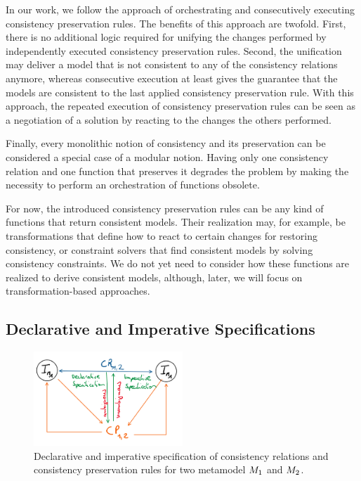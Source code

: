 In our work, we follow the approach of orchestrating and consecutively executing consistency preservation rules.
The benefits of this approach are twofold. First, there is no additional logic required for unifying the changes performed by independently executed consistency preservation rules. 
Second, the unification may deliver a model that is not consistent to any of the consistency relations anymore, whereas consecutive execution at least gives the guarantee that the models are consistent to the last applied consistency preservation rule.
With this approach, the repeated execution of consistency preservation rules can be seen as a negotiation of a solution by reacting to the changes the others performed.

\begin{remark} 
Finally, every monolithic notion of consistency and its preservation can be considered a special case of a modular notion. Having only one consistency relation and one function that preserves it degrades the problem by making the necessity to perform an orchestration of functions obsolete.
\end{remark}

For now, the introduced consistency preservation rules can be any kind of functions that return consistent models. 
Their realization may, for example, be transformations that define how to react to certain changes for restoring consistency, or constraint solvers that find consistent models by solving consistency constraints. 
We do not yet need to consider how these functions are realized to derive consistent models, although, later, we will focus on transformation-based approaches.


\subsection{Declarative and Imperative Specifications}
\label{chap:correcttnes:notions_consistency:declarative_imperative}

\begin{figure}
    \centering
    \includegraphics[width=0.5\textwidth]{figures/correctness/notion/declarative_imperative}
    \caption[Declarative and imperative consistency specification]{Declarative and imperative specification of consistency relations and consistency preservation rules for two metamodel $M_{1}$ and $M_{2}$.}
    \label{fig:correctness:declarative_imperative}
\end{figure}

